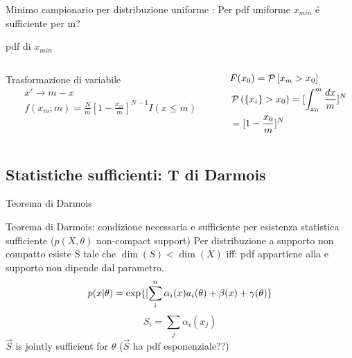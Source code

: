 \documentclass[asd-beamer.tex]{subfiles}%
\begin{document}
\begin{wordonframe}{Minimo campionario per distribuzione uniforme}
: Per pdf uniforme $x_{min}$ \'e sufficiente per m?
\end{wordonframe}

\begin{wordonframe}{}
pdf di $x_{min}$
\begin{columns}[T]
\begin{column}{0.5\textwidth}
Trasformazione di variabile
\begin{align*}
&x'\to m-x\\
&f(x_m;m)=\frac{N}{m}[1-\frac{x_m}{m}]^{N-1}I(x\leq m)
\end{align*}
\end{column}
\begin{column}{0.5\textwidth}
\begin{align*}
&F(x_0)=\operatorname{\mathcal{P}}{[x_m>x_0]}\\
&\operatorname{\mathcal{P}}{(\{x_i\}>x_0)}=[\int_{x_0}^m\frac{dx}{m}]^N\\
&=[1-\frac{x_0}{m}]^N
\end{align*}
\end{column}
\end{columns}
\end{wordonframe}

\subsection{Statistiche sufficienti: T di Darmois}

\begin{frame}{Teorema di Darmois}\frameintoc
\begin{block}{Teorema di Darmois: condizione necessaria e sufficiente per esistenza statistica sufficiente ($p(X,\theta)$ non-compact support)}
Per distribuzione a supporto non compatto esiste S tale che $\dim{(S)}<\dim{(X)}$ iff: pdf appartiene alla  e supporto non dipende dal parametro.
\begin{equation*}
p(x|\theta)=\text{exp}\{[\sum_i^n\alpha_i(x)a_i(\theta)+\beta(x)+\gamma(\theta)\}
\end{equation*}
\begin{equation*}
S_i=\sum_j\alpha_i(x_j)
\end{equation*}
$\vec{S}$ is jointly sufficient for $\theta$ ($\vec{S}$ ha pdf esponenziale??)
\end{block}
\end{frame}
\end{document}
